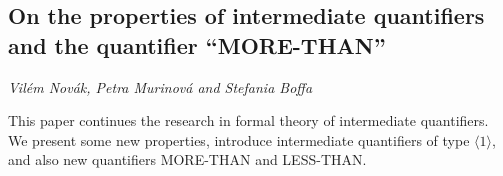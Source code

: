 \documentclass[../booklet.tex]{subfiles}
\begin{document}
\subsection[On the properties of intermediate quantifiers and the quantifier ``MORE-THAN''. {\it Vilém Novák, Petra Murinová and Stefania Boffa}]{On the properties of intermediate quantifiers and the quantifier ``MORE-THAN''}
  

\begin{center}
  {\it Vilém Novák, Petra Murinová and Stefania Boffa}
\end{center}



This paper continues the research in formal theory of intermediate quantifiers. We present some new properties, introduce intermediate quantifiers of type $\langle 1\rangle$, and also new quantifiers MORE-THAN and LESS-THAN.
%
\end{document}
